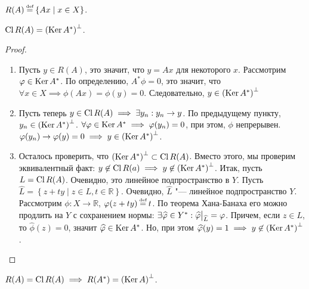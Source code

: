 \begin{definition}
    $R(A) \defeq \left\{ Ax \mid x \in X\right\}$.
\end{definition}

\begin{theorem}
    $\operatorname{Cl} R(A) = \left( \operatorname{Ker} A^*\right)^\bot$.
\end{theorem}
\begin{proof}\ 
    \begin{enumerate}
        \item
            Пусть $y \in R(A)$, это значит, что $y = Ax$ для некоторого $x$.
            Рассмотрим $\varphi \in \operatorname{Ker} A^*$. По определению, $A^*\phi = 0$, это значит,
            что $\forall x \in X \implies \phi(Ax) = \phi(y) = 0$.
            Следовательно, $y \in \left( \operatorname{Ker} A^*\right)^\bot$
        \item
            Пусть теперь $y \in \operatorname{Cl} R(A) \implies \exists y_n : y_n \rightarrow y$.
            По предыдущему пункту, $y_n \in \left( \operatorname{Ker} A^*\right)^\bot$.
            $\forall \varphi \in \operatorname{Ker} A^* \implies \varphi(y_n) = 0$, при этом, $\phi$ непрерывен.
            $\varphi(y_n) \rightarrow \varphi(y) = 0 \implies y \in \left( \operatorname{Ker} A^*\right)^\bot$.
        \item
            Осталось проверить, что $\left( \operatorname{Ker} A^*\right)^\bot \subset \operatorname{Cl} R(A)$.
            Вместо этого, мы проверим эквивалентный факт:
            $y \not\in \operatorname{Cl} R(a) \implies y \not\in \left( \operatorname{Ker} A^*\right)^\bot$.
            Итак, пусть $L = \operatorname{Cl} R(A)$. Очевидно, это линейное подпространство в $Y$.
            Пусть $\widehat{L} = \left\{ z + ty \mid z \in L, t \in \mathbb{R}\right\}$.
            Очевидно, $\widehat{L}$ "--- линейное подпространство $Y$.
            Рассмотрим $\phi : X \rightarrow \mathbb{R}$, $\phi(z + ty) \defeq t$.
            По теорема Хана-Банаха его можно продлить на $Y$ с сохранением нормы:
            $\exists \widehat{\phi} \in Y^* : \restr{\widehat{\phi}}{\widehat{L}} = \phi$.
            Причем, если $z \in L$, то $\widehat{\phi}(z) = 0$, значит $\widehat{\varphi} \in \operatorname{Ker} A^*$.
            Но, при этом $\widehat{\varphi}(y) = 1 \implies y \not\in \left( \operatorname{Ker} A^*\right)^\bot$. \qedhere
    \end{enumerate}
\end{proof}
\begin{theorem}
    $R(A) = \operatorname{Cl} R(A) \implies R(A^*) = \left( \operatorname{Ker} A\right)^\bot$.
\end{theorem}

